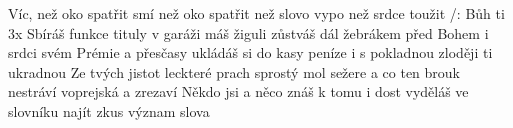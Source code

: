 \begin{TEXT}{Víc, než oko spatřit smí}
\REFREN  {} než oko spatřit   než slovo vypo \NL
{} než srdce toužit     /: Bůh ti                 3x 
\SLOKA Sbíráš funkce tituly v garáži máš žiguli \NL
zůstváš dál žebrákem před Bohem i srdci svém 
\SLOKA Prémie a přesčasy ukládáš si do kasy \NL
peníze i s pokladnou zloději ti ukradnou 
\SLOKA Ze tvých jistot leckteré prach sprostý mol sežere \NL
a co ten brouk nestráví voprejská a zrezaví 
\SLOKA Někdo jsi a něco znáš k tomu i dost vyděláš \NL
ve slovníku najít zkus význam slova  \NL
\end{TEXT}

